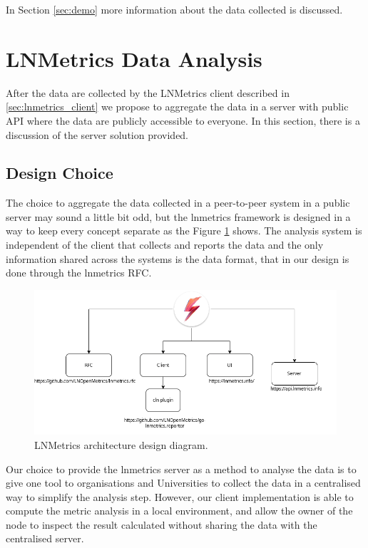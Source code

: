 In Section \ref{sec:demo} more information about the data collected is discussed.

\section{LNMetrics Data Analysis}
\label{sec:lnmetrics_server}

After the data are collected by the LNMetrics client described in \ref{sec:lnmetrics_client}
we propose to aggregate the data in a server with public API where the data are 
publicly accessible to everyone. In this section, there is a discussion of 
the server solution provided.

\subsection{Design Choice}

The choice to aggregate the data collected in a peer-to-peer system in a public 
server may sound a little bit odd, but the lnmetrics framework is designed in a 
way to keep every concept separate as the Figure \ref{fig:lnmetrics_architecture} 
shows. The analysis system is independent of the client that collects and reports
the data and the only information shared across the systems is the data format, 
that in our design is done through the lnmetrics RFC.

\begin{figure}
    \begin{center}
    \includegraphics[scale=0.5]{imgs/lnmetrics-architecture.drawio.png}
    \end{center}
    \caption{LNMetrics architecture design diagram.}
    \label{fig:lnmetrics_architecture}
\end{figure}

Our choice to provide the lnmetrics server as a method to analyse the data is to 
give one tool to organisations and Universities to collect the data in a centralised
way to simplify the analysis step. However, our client implementation is able
to compute the metric analysis in a local environment, and allow the owner
of the node to inspect the result calculated without sharing the data with the centralised
server.

